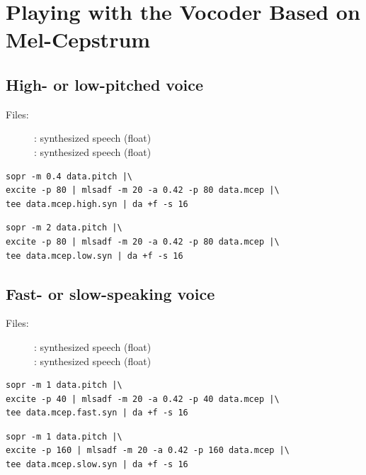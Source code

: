\documentclass[a4paper]{article}
\begin{document}
\section{Playing with the Vocoder Based on Mel-Cepstrum}

\subsection{High- or low-pitched voice}

\begin{description}
\item[Files:]
  : 
  synthesized speech (float)\\
  : 
  synthesized speech (float)
\end{description}

\begin{verbatim}
sopr -m 0.4 data.pitch |\
excite -p 80 | mlsadf -m 20 -a 0.42 -p 80 data.mcep |\
tee data.mcep.high.syn | da +f -s 16
\end{verbatim}

\begin{verbatim}
sopr -m 2 data.pitch |\
excite -p 80 | mlsadf -m 20 -a 0.42 -p 80 data.mcep |\
tee data.mcep.low.syn | da +f -s 16
\end{verbatim}

\subsection{Fast- or slow-speaking voice}

\begin{description}
\item[Files:]
  : 
  synthesized speech (float)\\
  : 
  synthesized speech (float)
\end{description}

\begin{verbatim}
sopr -m 1 data.pitch |\
excite -p 40 | mlsadf -m 20 -a 0.42 -p 40 data.mcep |\
tee data.mcep.fast.syn | da +f -s 16
\end{verbatim}

\begin{verbatim}
sopr -m 1 data.pitch |\
excite -p 160 | mlsadf -m 20 -a 0.42 -p 160 data.mcep |\
tee data.mcep.slow.syn | da +f -s 16
\end{verbatim}
\end{document}
